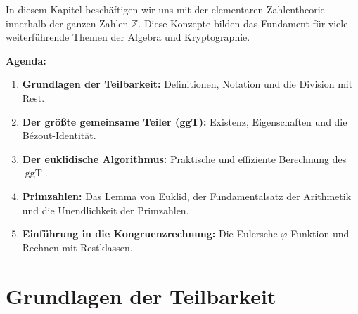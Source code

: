 


\begin{nice-box}
In diesem Kapitel beschäftigen wir uns mit der elementaren Zahlentheorie innerhalb der ganzen Zahlen $\mathbb{Z}$. Diese Konzepte bilden das Fundament für viele weiterführende Themen der Algebra und Kryptographie.

\textbf{Agenda:}
\begin{enumerate}[label=\textbf{(\arabic*)}]
    \item \textbf{Grundlagen der Teilbarkeit:} Definitionen, Notation und die Division mit Rest.
    \item \textbf{Der größte gemeinsame Teiler (ggT):} Existenz, Eigenschaften und die Bézout-Identität.
    \item \textbf{Der euklidische Algorithmus:} Praktische und effiziente Berechnung des $\operatorname{ggT}$.
    \item \textbf{Primzahlen:} Das Lemma von Euklid, der Fundamentalsatz der Arithmetik und die Unendlichkeit der Primzahlen.
    \item \textbf{Einführung in die Kongruenzrechnung:} Die Eulersche $\varphi$-Funktion und Rechnen mit Restklassen.
\end{enumerate}
\end{nice-box}

\section{Grundlagen der Teilbarkeit}

